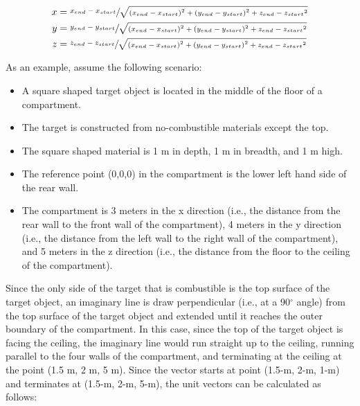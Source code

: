 \begin{equation}
  \begin{aligned}
 x &= \sfrac{x_{end} - x_{start}}{\sqrt{{ \left( {x_{end} - x_{start}} \right) }^2 + { \left( {y_{end} - y_{start}} \right) }^2 + {z_{end} - z_{start}}^2}} \\
 y &= \sfrac{y_{end} - y_{start}}{\sqrt{{ \left( {x_{end} - x_{start}} \right) }^2 + { \left( {y_{end} - y_{start}} \right) }^2 + {z_{end} - z_{start}}^2}} \\
 z &= \sfrac{z_{end} - z_{start}}{\sqrt{{ \left( {x_{end} - x_{start}} \right) }^2 + { \left( {y_{end} - y_{start}} \right) }^2 + {z_{end} - z_{start}}^2}}
  \end{aligned}
\end{equation}

As an example, assume the following scenario:

\begin{itemize}
\item A square shaped target object is located in the middle of the floor of a compartment.
\item The target is constructed from no-combustible materials except the top.
\item The square shaped material is 1 m in depth, 1 m in breadth, and 1 m high.
\item The reference point (0,0,0) in the compartment is the lower left hand side of the rear wall.
\item The compartment is 3 meters in the x direction (i.e., the distance from the rear wall to the front wall of the compartment), 4 meters in the y direction (i.e., the distance from the left wall to the right wall of the compartment), and 5 meters in the z direction (i.e., the distance from the floor to the ceiling of the compartment).
\end{itemize}

Since the only side of the target that is combustible is the top surface of the target object, an imaginary line is draw perpendicular (i.e., at a 90$^\circ$ angle) from the top surface of the target object and extended until it reaches the outer boundary of the compartment.  In this case, since the top of the target object is facing the ceiling, the imaginary line would run straight up to the ceiling, running parallel to the four walls of the compartment, and terminating at the ceiling at the point (1.5 m, 2 m, 5 m).  Since the vector starts at point (1.5-m, 2-m, 1-m) and terminates at (1.5-m, 2-m, 5-m), the unit vectors can be calculated as follows:


